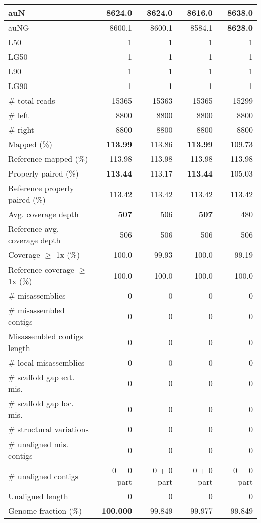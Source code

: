 \documentclass[12pt,a4paper]{article}
\begin{document}
\begin{table}[ht]
\begin{center}
\begin{tabular}{|l*{4}{|r}|}
auN & 8624.0 & 8624.0 & 8616.0 & {\bf 8638.0} \\ \hline
auNG & 8600.1 & 8600.1 & 8584.1 & {\bf 8628.0} \\ \hline
L50 & 1 & 1 & 1 & 1 \\ \hline
LG50 & 1 & 1 & 1 & 1 \\ \hline
L90 & 1 & 1 & 1 & 1 \\ \hline
LG90 & 1 & 1 & 1 & 1 \\ \hline
\# total reads & 15365 & 15363 & 15365 & 15299 \\ \hline
\# left & 8800 & 8800 & 8800 & 8800 \\ \hline
\# right & 8800 & 8800 & 8800 & 8800 \\ \hline
Mapped (\%) & {\bf 113.99} & 113.86 & {\bf 113.99} & 109.73 \\ \hline
Reference mapped (\%) & 113.98 & 113.98 & 113.98 & 113.98 \\ \hline
Properly paired (\%) & {\bf 113.44} & 113.17 & {\bf 113.44} & 105.03 \\ \hline
Reference properly paired (\%) & 113.42 & 113.42 & 113.42 & 113.42 \\ \hline
Avg. coverage depth & {\bf 507} & 506 & {\bf 507} & 480 \\ \hline
Reference avg. coverage depth & 506 & 506 & 506 & 506 \\ \hline
Coverage $\geq$ 1x (\%) & 100.0 & 99.93 & 100.0 & 99.19 \\ \hline
Reference coverage $\geq$ 1x (\%) & 100.0 & 100.0 & 100.0 & 100.0 \\ \hline
\# misassemblies & 0 & 0 & 0 & 0 \\ \hline
\# misassembled contigs & 0 & 0 & 0 & 0 \\ \hline
Misassembled contigs length & 0 & 0 & 0 & 0 \\ \hline
\# local misassemblies & 0 & 0 & 0 & 0 \\ \hline
\# scaffold gap ext. mis. & 0 & 0 & 0 & 0 \\ \hline
\# scaffold gap loc. mis. & 0 & 0 & 0 & 0 \\ \hline
\# structural variations & 0 & 0 & 0 & 0 \\ \hline
\# unaligned mis. contigs & 0 & 0 & 0 & 0 \\ \hline
\# unaligned contigs & 0 + 0 part & 0 + 0 part & 0 + 0 part & 0 + 0 part \\ \hline
Unaligned length & 0 & 0 & 0 & 0 \\ \hline
Genome fraction (\%) & {\bf 100.000} & 99.849 & 99.977 & 99.849 \\ \hline

\end{tabular}
\end{center}
\end{table}
\end{document}
